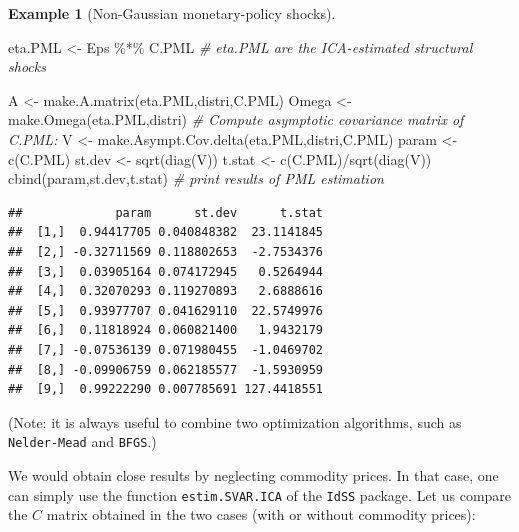 \documentclass[
  12pt,
]{book}
\newenvironment{Shaded}{\begin{snugshade}}{\end{snugshade}}
\newcommand{\AttributeTok}[1]{\textcolor[rgb]{0.77,0.63,0.00}{#1}}
\newcommand{\CommentTok}[1]{\textcolor[rgb]{0.56,0.35,0.01}{\textit{#1}}}
\newcommand{\ConstantTok}[1]{\textcolor[rgb]{0.00,0.00,0.00}{#1}}
\newcommand{\DecValTok}[1]{\textcolor[rgb]{0.00,0.00,0.81}{#1}}
\newcommand{\FunctionTok}[1]{\textcolor[rgb]{0.00,0.00,0.00}{#1}}
\newcommand{\NormalTok}[1]{#1}
\newcommand{\OtherTok}[1]{\textcolor[rgb]{0.56,0.35,0.01}{#1}}
\newcommand{\SpecialCharTok}[1]{\textcolor[rgb]{0.00,0.00,0.00}{#1}}
\theoremstyle{definition}
\theoremstyle{definition}
\newtheorem{example}{Example}[chapter]
\theoremstyle{definition}
\theoremstyle{definition}
\theoremstyle{remark}
\begin{document}
\begin{example}[Non-Gaussian monetary-policy shocks]
\begin{Shaded}
\begin{Highlighting}[]
\NormalTok{eta.PML }\OtherTok{\textless{}{-}}\NormalTok{ Eps }\SpecialCharTok{\%*\%}\NormalTok{ C.PML }\CommentTok{\# eta.PML are the ICA{-}estimated structural shocks}

\NormalTok{A }\OtherTok{\textless{}{-}} \FunctionTok{make.A.matrix}\NormalTok{(eta.PML,distri,C.PML)}
\NormalTok{Omega }\OtherTok{\textless{}{-}} \FunctionTok{make.Omega}\NormalTok{(eta.PML,distri)}
\CommentTok{\# Compute asymptotic covariance matrix of C.PML:}
\NormalTok{V }\OtherTok{\textless{}{-}} \FunctionTok{make.Asympt.Cov.delta}\NormalTok{(eta.PML,distri,C.PML)}
\NormalTok{param }\OtherTok{\textless{}{-}} \FunctionTok{c}\NormalTok{(C.PML)}
\NormalTok{st.dev }\OtherTok{\textless{}{-}} \FunctionTok{sqrt}\NormalTok{(}\FunctionTok{diag}\NormalTok{(V))}
\NormalTok{t.stat }\OtherTok{\textless{}{-}} \FunctionTok{c}\NormalTok{(C.PML)}\SpecialCharTok{/}\FunctionTok{sqrt}\NormalTok{(}\FunctionTok{diag}\NormalTok{(V))}
\FunctionTok{cbind}\NormalTok{(param,st.dev,t.stat) }\CommentTok{\# print results of PML estimation}
\end{Highlighting}
\end{Shaded}

\begin{verbatim}
##             param      st.dev      t.stat
##  [1,]  0.94417705 0.040848382  23.1141845
##  [2,] -0.32711569 0.118802653  -2.7534376
##  [3,]  0.03905164 0.074172945   0.5264944
##  [4,]  0.32070293 0.119270893   2.6888616
##  [5,]  0.93977707 0.041629110  22.5749976
##  [6,]  0.11818924 0.060821400   1.9432179
##  [7,] -0.07536139 0.071980455  -1.0469702
##  [8,] -0.09906759 0.062185577  -1.5930959
##  [9,]  0.99222290 0.007785691 127.4418551
\end{verbatim}

(Note: it is always useful to combine two optimization algorithms, such as \texttt{Nelder-Mead} and \texttt{BFGS}.)

We would obtain close results by neglecting commodity prices. In that case, one can simply use the function \texttt{estim.SVAR.ICA} of the \texttt{IdSS} package. Let us compare the \(C\) matrix obtained in the two cases (with or without commodity prices):

\begin{Shaded}
\end{Shaded}


\end{example}
\end{document}
